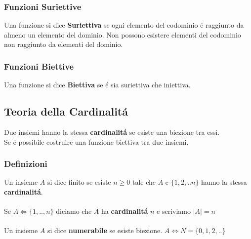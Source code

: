 \documentclass[11pt]{article}
\begin{document}
        \subsubsection{Funzioni Suriettive}
            Una funzione si dice \textbf{Suriettiva} se ogni elemento del codominio \'e raggiunto da almeno un elemento del dominio. Non possono esistere elementi del codominio non raggiunto da elementi del dominio.
        \subsubsection{Funzioni Biettive}
            Una funzione si dice \textbf{Biettiva} se \'e sia suriettiva che iniettiva.
    \subsection{Teoria della Cardinalit\'a}
        Due insiemi hanno la stessa \textbf{cardinalit\'a} se esiste una biezione tra essi.\\
        Se \'e possibile costruire una funzione biettiva tra due insiemi.
        \subsubsection{Definizioni}
            Un insieme $A$ si dice finito se esiste $n \geq 0$ tale che $A$ e $\{1,2,..n\}$ hanno la stessa \textbf{cardinalit\'a}.  \\
            \\
            Se $A \iff \{1,..,n\}$ diciamo che $A$ ha \textbf{cardinalit\'a} $n$ e scriviamo  
            $\mid A \mid  =  n $ 
            \\
            \\
            Un insieme $A$ si dice \textbf{numerabile} se esiste biezione. 
            $A \iff N = \{0,1,2,..\}$
\end{document}
